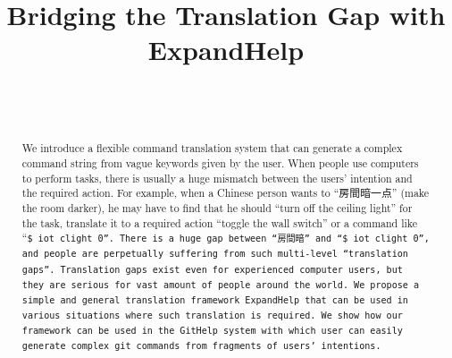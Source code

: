 \documentclass{sigchi}
\def\plaintitle{Bridging the Translation Gap with ExpandHelp}
\def\GH{\textsf{GitHelp}}
\def\EH{\textsf{ExpandHelp}}
\begin{document}
\title{\plaintitle}

\author{%
  \\
  \\
}

\maketitle

\begin{abstract}
  We introduce a flexible command translation system that can generate
  a complex command string from vague keywords
  given by the user.
  When people use computers to perform tasks,
  there is usually a huge mismatch between the users' intention
  and the required action.
  For example, when a Chinese person wants to ``房間暗一点'' (make the room darker),
  he may have to find that he should ``turn off the ceiling light'' for the task,
  translate it to a required action ``toggle the wall switch''
  or a command like ``\tt{\$ iot clight 0}''.
  There is a huge gap between ``房間暗'' and ``\tt{\$ iot clight 0}'', and
  people are perpetually suffering from such multi-level ``\textit{translation gaps}''.
  Translation gaps exist even for experienced computer users, but
  they are serious for vast amount of people around the world.
  We propose a simple and general translation framework
  {\EH} that can be used in various situations
  where such translation is required.
  We show how our framework can be used
  in the {\GH} system
  with which user can easily generate complex \tt{git} commands
  from fragments of users' intentions.
\end{abstract}
\end{document}
